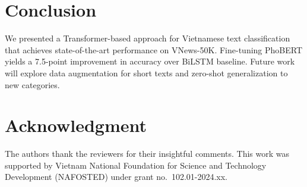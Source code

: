 \documentclass[conference]{IEEEtran}
\begin{document}
\section{Conclusion}

We presented a Transformer-based approach for Vietnamese text classification
that achieves state-of-the-art performance on VNews-50K. Fine-tuning
PhoBERT yields a 7.5-point improvement in accuracy over BiLSTM baseline.
Future work will explore data augmentation for short texts and
zero-shot generalization to new categories.

\section*{Acknowledgment}

The authors thank the reviewers for their insightful comments.
This work was supported by Vietnam National Foundation for Science
and Technology Development (NAFOSTED) under grant no.\ 102.01-2024.xx.

\printbibliography
\end{document}
